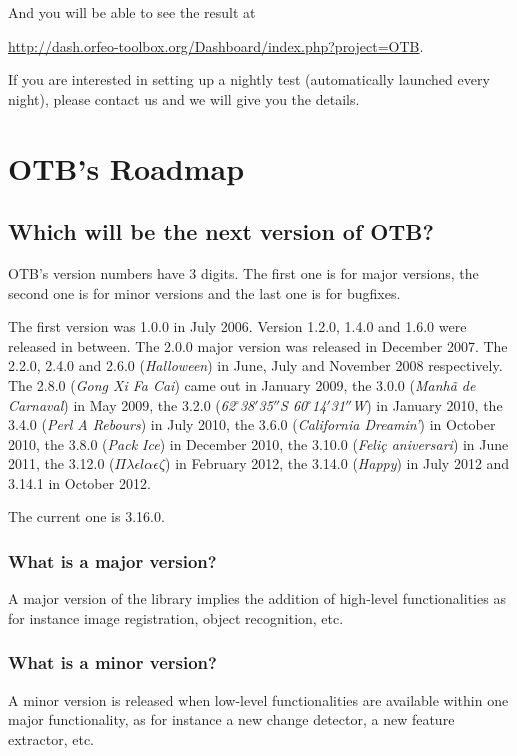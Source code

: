 And you will be able to see the result at

\url{http://dash.orfeo-toolbox.org/Dashboard/index.php?project=OTB}.

If you are interested in setting up a nightly test (automatically launched every night), please contact us and we will give you the details.

\section{OTB's Roadmap}

\subsection{Which will be the next version of OTB?}
OTB's version numbers have 3 digits. The first one is for major
versions, the second one is for minor versions and the last one is for
bugfixes.

The first version was 1.0.0 in July 2006. Version 1.2.0, 1.4.0 and 1.6.0 were
released in between. The 2.0.0 major version  was released in December 2007.
The 2.2.0, 2.4.0 and 2.6.0 ({\em Halloween}) in June, July and November 2008 respectively. The
2.8.0 ({\em Gong Xi Fa Cai}) came out in January 2009, the 3.0.0 ({\em Manh\~{a} de Carnaval}) in May 2009, the 3.2.0 ({\em 62$^\circ$38${'}$35${''}$S 60$^\circ$14${'}$31${''}$W}) in January 2010, the 3.4.0 ({\em Perl A Rebours}) in July 2010, the 3.6.0 ({\em California Dreamin'}) in October 2010, the 3.8.0 ({\em Pack Ice}) in December 2010, the 3.10.0 ({\em Feli\c{c} aniversari}) in June 2011, the 3.12.0 ({\em $\Pi \lambda \epsilon l \alpha \epsilon \zeta$}) in February 2012, the 3.14.0 ({\em Happy}) in July 2012 and 3.14.1 in October 2012. 

The current one is 3.16.0.

\subsubsection{What is a major version?}
A major version of the library implies the addition of high-level
functionalities as for instance image registration, object recognition, etc.

\subsubsection{What is a minor version?}
A minor version is released when low-level functionalities are
available within one major functionality, as for instance a new
change detector, a new feature extractor, etc.

